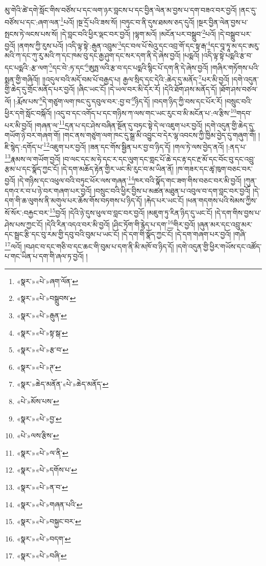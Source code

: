 མུ་གེའི་ཚེ་དགེ་སློང་གིས་བཙོས་པ་དང་ལག་ཉར་བླངས་པ་དང་བྱིན་ལེན་མ་བྱས་པ་དག་བཟའ་བར་བྱའོ། །ནང་དུ་བཙོས་པ་དང་:ཞག་ལན་\footnote{«སྣར་»«པེ་»ཞག་ལོན་}པའོ། །སྔ་དྲོ་པའི་ཟས་སོ། །བཏུང་བ་ནི་དུས་ཐམས་ཅད་དུའོ། །སྔར་བྱིན་ལེན་བྱས་པ་སྤངས་ཏེ་ལངས་པས་སོ། །དེ་བླང་བའི་ཕྱིར་ལྡང་བར་བྱའོ། །ལྷག་མའོ། །མངོན་པར་བསྒྲུབ་\footnote{«སྣར་»«པེ་»བསྒྲུབས་}པའོ། །དེ་བསྒྲུབ་པར་བྱའོ། །ནགས་ཀྱི་རུས་པའོ། །འདི་ལྟ་སྟེ་:རྒུན་འབྲུམ་\footnote{«སྣར་»«པེ་»རྒུན་}དང་བལ་པོ་སེའུ་དང་འབྲ་གོ་དང་སྟ་རྒ་\footnote{«སྣར་»«པེ་»སྟ་སྒ་}དང་བཱ་ཏཱ་མ་དང་ཨརུ་མའི་ཀ་དང་ཀུ་རུ་མའི་ཀ་དང་ཁམ་བུ་དང་རྒྱ་ཤུག་དང་སར་དག་ནི་དེ་ཞེས་བྱའོ། །པདྨའོ། །འདི་ལྟ་སྟེ་པདྨའི་རྩ་བ་དང་པདྨའི་:རྩ་ལག་\footnote{«སྣར་»«པེ་»རྩ་བ་}དང་བེ་:ཏ་དང་\footnote{«སྣར་»«པེ་»ཊ་}ཨུཏྤ་ལའི་རྩ་བ་དང་པདྨའི་སྙིང་པོ་དག་ནི་དེ་ཞེས་བྱའོ། །གཞིར་གཏོགས་པའི་སྨན་གྱི་གཞིའོ།། །།འདུལ་བའི་མདོ་བམ་པོ་བརྒྱད་པ། རྒྱལ་སྲིད་དང་དེའི་:ཆེད་དུ་མནོད་\footnote{«སྣར་»ཆེད་མནོན་«པེ་»ཆེད་མནོད་}པར་མི་བྱའོ། །དགེ་འདུན་གྱི་ཆེད་དུ་གྲོང་མནོད་པར་བྱའོ། །ཞིང་ཡང་ངོ། །དེ་ཡལ་བར་མི་དོར་རོ། །དེའི་ཐོག་ཤས་མནོད་དོ། །ཐོག་ཤས་བཙལ་ལོ། །:རྨོས་པས་\footnote{«པེ་»མོས་པས་}དེ་གཙུག་ལག་ཁང་དུ་དབུལ་བར་:བྱ་བ་\footnote{«སྣར་»«པེ་»བྱ་}ཉིད་དོ། །བདག་ཉིད་ཀྱི་བས་དང་པོར་རོ། །བསྲུང་བའི་ཕྱིར་དགེ་སློང་བསྐོའོ། །འདུ་བ་དང་འགོད་པ་དང་གཉིས་ཀ་ལས་གང་ཡང་རུང་བ་མི་མངོན་པ་:ལ་རྩིས་\footnote{«པེ་»ལས་རྩིས་}གདབ་པར་མི་བྱའོ། །གཞན་ལ་\footnote{«སྣར་»«པེ་»ལ་ནི་}དྲན་པ་དང་ཤེས་བཞིན་སྔོན་དུ་བཏང་སྟེ་དེ་ལ་འཇུག་པར་བྱའོ། །དགེ་འདུན་གྱི་ཆེད་དུ་གཡོག་ཉེ་བར་གཞག་གོ། །གང་ནས་གཙུག་ལག་ཁང་དུ་སྒྲ་མི་འབྱུང་བ་དེར་ལྷ་འབངས་ཀྱི་ཁྱིམ་བྱེད་དུ་གཞུག་གོ། །ཇི་སྙེད་:དགོད་པ་\footnote{«སྣར་»«པེ་»དགོས་པ་}འཇུག་པར་བྱའོ། །ཟན་དང་གོས་སྦྱིན་པར་བྱ་བ་ཉིད་དོ། །གལ་ཏེ་ལས་བྱེད་ནའོ། །:ནད་པ་\footnote{«སྣར་»«པེ་»ན་བ་}རྣམས་ལ་གཡོག་བྱའོ། །བ་ལང་དང་མ་ཧེ་དང་ར་དང་ལུག་དང་གླང་པོ་ཆེ་དང་རྟ་དང་རྔ་མོ་དང་བོང་བུ་དང་འབྲུ་རྩམ་པ་དང་སྣོད་ཀྱང་ངོ། །དེ་དག་མཆོད་རྟེན་གྱིར་ཡང་མི་རུང་བ་མ་ཡིན་ནོ། །ཁ་གཟར་དང་ཚྭ་ཁུག་བཅང་བར་བྱའོ། །དེ་གཉིས་དང་འཕུལ་བའི་བཏུང་ཕོར་ལས་གཞན་\footnote{«སྣར་»«པེ་»གཞན་པའི་}ཁར་བའི་སྣོད་གང་ཟག་གིས་བཅང་བར་མི་བྱའོ། །ཀུན་དགའ་ར་བ་པ་ཉེ་བར་གཞག་པར་བྱའོ། །བསྲུང་བའི་ཕྱིར་བྱིས་པ་མཚན་མཐུན་པ་འབུལ་བ་དག་བླང་བར་བྱའོ། །དེ་དག་གི་ཆ་ལུགས་ནི་མགུལ་པར་ཆོས་གོས་བཏགས་པ་ཉིད་དོ། །རྐེད་པར་ཡང་ངོ། །ཕན་གདགས་པའི་སེམས་ཀྱིས་སོ་སོར་:བརྐྱང་བར་\footnote{«སྣར་»«པེ་»བསྐྱང་བར་}བྱའོ། །དེའི་ཉེ་དུས་ཕུལ་བ་བླང་བར་བྱའོ། །མཇུག་ཏུ་རིན་ཉིད་དུ་ཡང་ངོ། །དེ་དག་གིས་བྱས་པ་ཤེས་པས་ཀྱང་ངོ། །དེའི་རིན་འདའ་བར་མི་བྱའོ། །ཤིང་ཏོག་གི་རྙེད་པ་དག་\footnote{«སྣར་»«པེ་»བདག་}གིར་བྱའོ། །ཞུན་མར་དང་འབྲུ་མར་དང་སྦྲང་རྩི་དང་བུ་རམ་གྱི་དབུ་བའི་བུམ་པ་ཡང་ངོ། །དེ་དག་གི་སྣོད་ཀྱང་ངོ། །དེ་དག་གཞག་པར་བྱའོ། །གཞི་\footnote{«སྣར་»«པེ་»བཞི་}ལའོ། །བཤང་བ་དང་གཅི་བ་དང་ཆང་གི་བུམ་པ་དག་ནི་མི་མཁོ་བ་ཉིད་དོ། །དགེ་འདུན་གྱི་ཕྱིར་གཡོས་དང་འཚོད་པ་གང་ཡིན་པ་དག་གི་ཞལ་ཏ་བྱའོ། །
